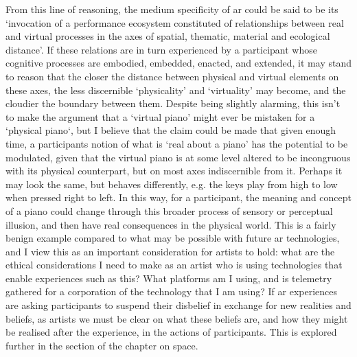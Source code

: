 From this line of reasoning, the medium specificity of \gls{ar} could be said to be its `invocation of a performance ecosystem constituted of relationships between real and virtual processes in the axes of spatial, thematic, material and ecological distance'. If these relations are in turn experienced by a participant whose cognitive processes are embodied, embedded, enacted, and extended, it may stand to reason that the closer the distance between physical and virtual elements on these axes, the less discernible `physicality' and `virtuality' may become, and the cloudier the boundary between them. Despite being slightly alarming, this isn't to make the argument that a `virtual piano' might ever be mistaken for a `physical piano`, but I believe that the claim could be made that given enough time, a participants notion of what is `real about a piano' has the potential to be modulated, given that the virtual piano is at some level altered to be incongruous with its physical counterpart, but on most axes indiscernible from it. Perhaps it may look the same, but behaves differently, e.g. the keys play from high to low when pressed right to left. In this way, for a participant, the meaning and concept of a piano could change through this broader process of sensory or perceptual illusion, and then have real consequences in the physical world. This is a fairly benign example compared to what may be possible with future \gls{ar} technologies, and I view this as an important consideration for artists to hold: what are the ethical considerations I need to make as an artist who is using technologies that enable experiences such as this? What platforms am I using, and is telemetry gathered for a corporation of the technology that I am using? If \gls{ar} experiences are asking participants to suspend their disbelief in exchange for new realities and beliefs, as artists we must be clear on what these beliefs are, and how they might be realised after the experience, in the actions of participants. This is explored further in the section of the chapter on space.

